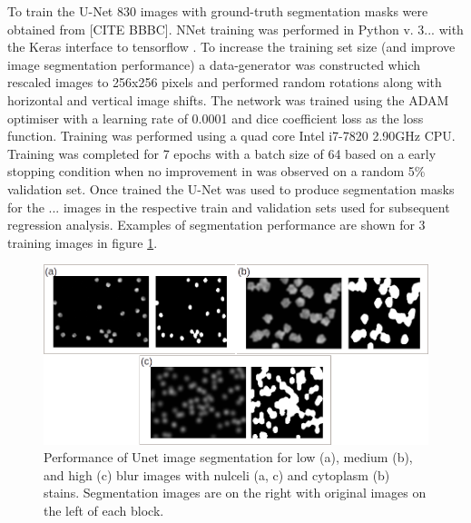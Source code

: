 \documentclass[isoft]{poster_class_UofC}
\begin{document}
\begin{poster}
        To train the U-Net 830 images with ground-truth segmentation masks were obtained from [CITE BBBC].  NNet training was performed in Python v. 3... with the Keras interface to tensorflow \cite{chollet2015keras}.  To increase the training set size (and improve image segmentation performance) a data-generator was constructed which rescaled images to 256x256 pixels and performed random rotations along with horizontal and vertical image shifts.  The network was trained using the ADAM optimiser with a learning rate of 0.0001 and dice coefficient loss as the loss function.  Training was performed using a quad core Intel i7-7820 2.90GHz CPU.  Training was completed for 7 epochs with a batch size of 64 based on a early stopping condition when no improvement in was observed on a random 5\% validation set.  Once trained the U-Net was used to produce segmentation masks for the ... images in the respective train and validation sets used for subsequent regression analysis.  Examples of segmentation performance are shown for 3 training images in figure \ref{fig:segmentation_performance}.
        
           \begin{figure}
            \centering
            \captionsetup{type=figure}
            \includegraphics[scale=1.5]{./images/cell_images.png}
            \caption{Performance of Unet image segmentation for low (a), medium (b), and high (c) blur images with nulceli (a, c) and cytoplasm (b) stains.  Segmentation images are on the right with original images on the left of each block.}
            \label{fig:segmentation_performance}
        \end{figure}     
          

\end{poster}
\end{document}
